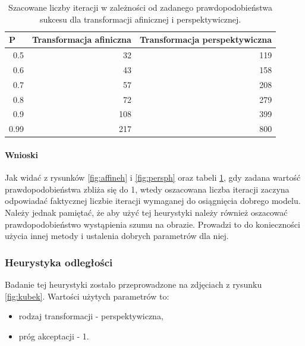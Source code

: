 \documentclass{article}
\begin{document}
	\begin{table}[H]
		\caption{Szacowane liczby iteracji w zależności od zadanego prawdopodobieństwa sukcesu dla transformacji afinicznej i perspektywicznej.}
		\centering
		\label{tab:heur_iters}
		\begin{tabular}{|r|r|r|}
			\hline
			\multicolumn{1}{|l|}{\textbf{P}} & \multicolumn{1}{l|}{\textbf{Transformacja afiniczna}} & \multicolumn{1}{l|}{\textbf{Transformacja perspektywiczna}} \\ \hline
			0.5                              & 32                                                    & 119                                                         \\ \hline
			0.6                              & 43                                                    & 158                                                         \\ \hline
			0.7                              & 57                                                    & 208                                                         \\ \hline
			0.8                              & 72                                                    & 279                                                         \\ \hline
			0.9                              & 108                                                   & 399                                                         \\ \hline
			0.99                             & 217                                                   & 800                                                         \\ \hline
		\end{tabular}
	\end{table}
	\paragraph{Wnioski}
	Jak widać z rysunków \ref{fig:affineh} i \ref{fig:persph} oraz tabeli \ref{tab:heur_iters}, gdy zadana wartość prawdopodobieństwa zbliża się do 1, wtedy oszacowana liczba iteracji zaczyna odpowiadać faktycznej liczbie iteracji wymaganej do osiągnięcia dobrego modelu. Należy jednak pamiętać, że aby użyć tej heurystyki należy również oszacować prawdopodobieństwo wystąpienia szumu na obrazie. Prowadzi to do konieczności użycia innej metody i ustalenia dobrych parametrów dla niej.
	
	\subsubsection{Heurystyka odległości}
	Badanie tej heurystyki zostało przeprowadzone na zdjęciach z rysunku \ref{fig:kubek}.
	Wartości użytych parametrów to:
	\begin{itemize}
		\item rodzaj transformacji - perspektywiczna,
		\item próg akceptacji - 1.
	\end{itemize}
\end{document}
